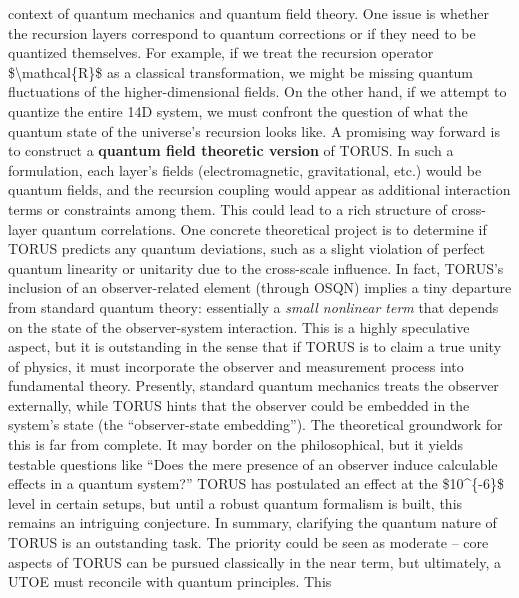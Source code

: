 \documentclass[
]{article}
\begin{document}
{\begin{itemize}
  context of quantum mechanics and quantum field theory. One issue is
  whether the recursion layers correspond to quantum corrections or if
  they need to be quantized themselves. For example, if we treat the
  recursion operator \$\textbackslash mathcal\{R\}\$ as a classical
  transformation, we might be missing quantum fluctuations of the
  higher-dimensional fields. On the other hand, if we attempt to
  quantize the entire 14D system, we must confront the question of what
  the quantum state of the universe's recursion looks like. A promising
  way forward is to construct a \textbf{quantum field theoretic version}
  of TORUS\hspace{0pt}. In such a formulation, each layer's fields
  (electromagnetic, gravitational, etc.) would be quantum fields, and
  the recursion coupling would appear as additional interaction terms or
  constraints among them. This could lead to a rich structure of
  cross-layer quantum correlations. One concrete theoretical project is
  to determine if TORUS predicts any quantum deviations, such as a
  slight violation of perfect quantum linearity or unitarity due to the
  cross-scale influence. In fact, TORUS's inclusion of an
  observer-related element (through OSQN) implies a tiny departure from
  standard quantum theory: essentially a \emph{small nonlinear term}
  that depends on the state of the observer-system
  interaction\hspace{0pt}. This is a highly speculative aspect, but it
  is outstanding in the sense that if TORUS is to claim a true unity of
  physics, it must incorporate the observer and measurement process into
  fundamental theory. Presently, standard quantum mechanics treats the
  observer externally, while TORUS hints that the observer could be
  embedded in the system's state (the ``observer-state
  embedding'')\hspace{0pt}. The theoretical groundwork for this is far
  from complete. It may border on the philosophical, but it yields
  testable questions like ``Does the mere presence of an observer induce
  calculable effects in a quantum system?'' TORUS has postulated an
  effect at the \$10\^{}\{-6\}\$ level in certain setups\hspace{0pt},
  but until a robust quantum formalism is built, this remains an
  intriguing conjecture. In summary, clarifying the quantum nature of
  TORUS is an outstanding task. The priority could be seen as moderate
  -- core aspects of TORUS can be pursued classically in the near term,
  but ultimately, a UTOE must reconcile with quantum principles. This

\end{itemize}}
\end{document}
